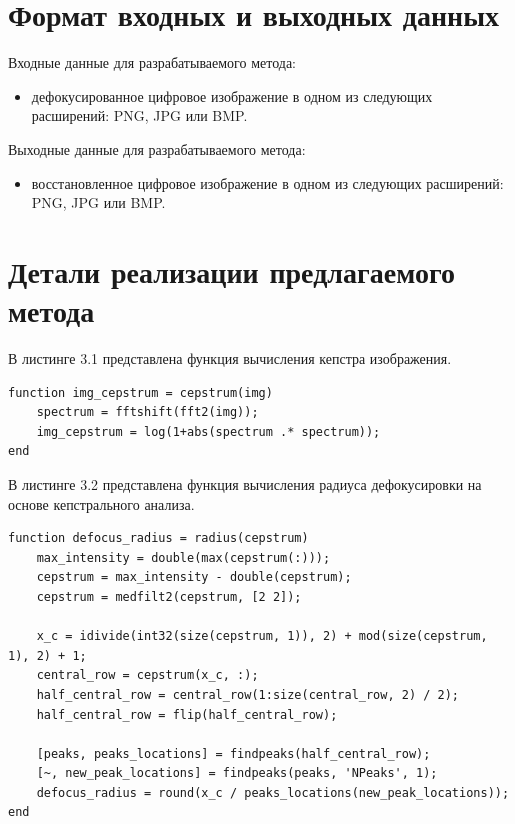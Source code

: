 \section{Формат входных и выходных данных}

Входные данные для разрабатываемого метода:

\begin{itemize}
	\item дефокусированное цифровое изображение в одном из следующих расширений: PNG, JPG или BMP.
\end{itemize}

Выходные данные для разрабатываемого метода:

\begin{itemize}
	\item восстановленное цифровое изображение в одном из следующих расширений: PNG, JPG или BMP.
\end{itemize}

\section{Детали реализации предлагаемого метода}

В листинге 3.1 представлена функция вычисления кепстра изображения.

\begin{lstlisting}[caption={Функция вычисления кепстра изображения}]
function img_cepstrum = cepstrum(img)
	spectrum = fftshift(fft2(img));
	img_cepstrum = log(1+abs(spectrum .* spectrum));
end
\end{lstlisting}

В листинге 3.2 представлена функция вычисления радиуса дефокусировки на основе кепстрального анализа.

\begin{lstlisting}[caption={Функция вычисления радиуса дефокусировки}]
function defocus_radius = radius(cepstrum)
	max_intensity = double(max(cepstrum(:)));
	cepstrum = max_intensity - double(cepstrum);
	cepstrum = medfilt2(cepstrum, [2 2]);
	
	x_c = idivide(int32(size(cepstrum, 1)), 2) + mod(size(cepstrum, 1), 2) + 1;
	central_row = cepstrum(x_c, :);
	half_central_row = central_row(1:size(central_row, 2) / 2);
	half_central_row = flip(half_central_row);
	
	[peaks, peaks_locations] = findpeaks(half_central_row);
	[~, new_peak_locations] = findpeaks(peaks, 'NPeaks', 1);
	defocus_radius = round(x_c / peaks_locations(new_peak_locations));
end
\end{lstlisting}


